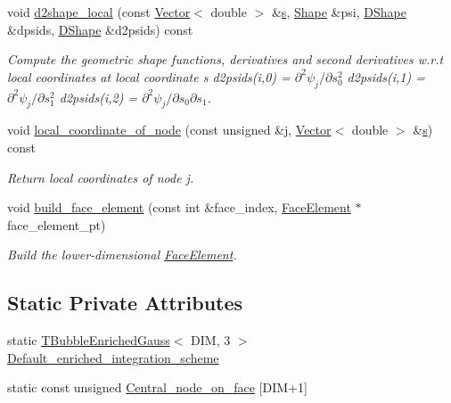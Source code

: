 \begin{DoxyCompactItemize}
void \hyperlink{classoomph_1_1TBubbleEnrichedElement_3_01DIM_00_013_01_4_af362359deb0709dc5d42b29eaf776152}{d2shape\+\_\+local} (const \hyperlink{classoomph_1_1Vector}{Vector}$<$ double $>$ \&\hyperlink{cfortran_8h_ab7123126e4885ef647dd9c6e3807a21c}{s}, \hyperlink{classoomph_1_1Shape}{Shape} \&psi, \hyperlink{classoomph_1_1DShape}{D\+Shape} \&dpsids, \hyperlink{classoomph_1_1DShape}{D\+Shape} \&d2psids) const
\begin{DoxyCompactList}\small\item\em Compute the geometric shape functions, derivatives and second derivatives w.\+r.\+t local coordinates at local coordinate s d2psids(i,0) = $ \partial^2 \psi_j / \partial s_0^2 $ d2psids(i,1) = $ \partial^2 \psi_j / \partial s_1^2 $ d2psids(i,2) = $ \partial^2 \psi_j / \partial s_0 \partial s_1 $. \end{DoxyCompactList}\item 
void \hyperlink{classoomph_1_1TBubbleEnrichedElement_3_01DIM_00_013_01_4_af0da229b9fbea583877e7fa5d5992cdb}{local\+\_\+coordinate\+\_\+of\+\_\+node} (const unsigned \&j, \hyperlink{classoomph_1_1Vector}{Vector}$<$ double $>$ \&\hyperlink{cfortran_8h_ab7123126e4885ef647dd9c6e3807a21c}{s}) const
\begin{DoxyCompactList}\small\item\em Return local coordinates of node j. \end{DoxyCompactList}\item 
void \hyperlink{classoomph_1_1TBubbleEnrichedElement_3_01DIM_00_013_01_4_a3297077e3bd4514380233784ce6d4a19}{build\+\_\+face\+\_\+element} (const int \&face\+\_\+index, \hyperlink{classoomph_1_1FaceElement}{Face\+Element} $\ast$face\+\_\+element\+\_\+pt)
\begin{DoxyCompactList}\small\item\em Build the lower-\/dimensional \hyperlink{classoomph_1_1FaceElement}{Face\+Element}. \end{DoxyCompactList}\end{DoxyCompactItemize}
\subsection*{Static Private Attributes}
\begin{DoxyCompactItemize}
\item 
static \hyperlink{classoomph_1_1TBubbleEnrichedGauss}{T\+Bubble\+Enriched\+Gauss}$<$ D\+IM, 3 $>$ \hyperlink{classoomph_1_1TBubbleEnrichedElement_3_01DIM_00_013_01_4_acd57a0473fd5ef1bd69f1a2a4ce26df6}{Default\+\_\+enriched\+\_\+integration\+\_\+scheme}
\item 
static const unsigned \hyperlink{classoomph_1_1TBubbleEnrichedElement_3_01DIM_00_013_01_4_a3b07ec8fd22312d11af3fc8b61609b93}{Central\+\_\+node\+\_\+on\+\_\+face} \mbox{[}D\+IM+1\mbox{]}
\end{DoxyCompactItemize}


